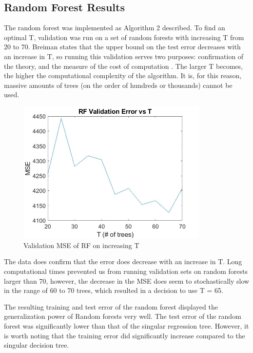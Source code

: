 \documentclass{article}
\begin{document}
\subsection{Random Forest Results}

The random forest was implemented as Algorithm 2 described. To find an optimal T, validation was run on a set of random forests with increasing T from 20 to 70. Breiman states that the upper bound on the test error decreases with an increase in T, so running this validation serves two purposes: confirmation of the theory, and the measure of the cost of computation \cite{Breiman}. The larger T becomes, the higher the computational complexity of the algorithm. It is, for this reason, massive amounts of trees (on the order of hundreds or thousands) cannot be used.

\begin{figure}[h]
\caption{Validation MSE of RF on increasing T}
\centering
\includegraphics[width=0.85\textwidth]{Fig5}
\end{figure}

The data does confirm that the error does decrease with an increase in T. Long computational times prevented us from running validation sets on random forests larger than 70, however, the decrease in the MSE does seem to stochastically slow in the range of 60 to 70 trees, which resulted in a decision to use T = 65.

The resulting training and test error of the random forest displayed the generalization power of Random forests very well. The test error of the random forest was significantly lower than that of the singular regression tree. However, it is worth noting that the training error did significantly increase compared to the singular decision tree.
\end{document}
